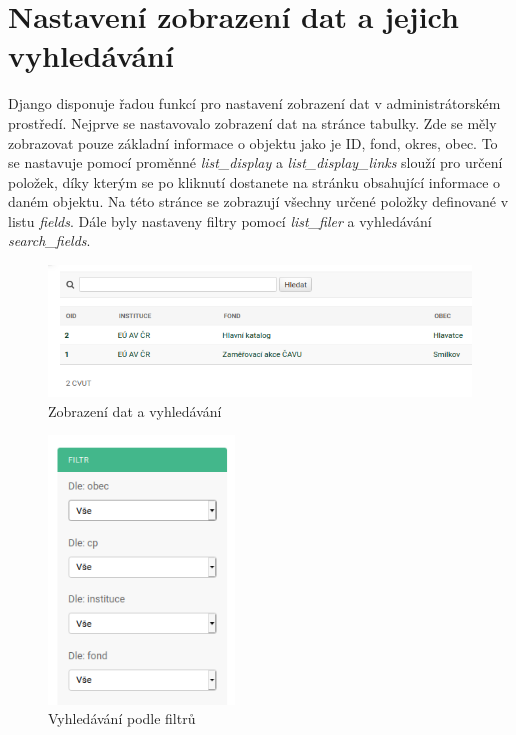 \section{Nastavení zobrazení dat a jejich vyhledávání}

Django disponuje řadou funkcí pro nastavení zobrazení dat v administrátorském prostředí. Nejprve se nastavovalo zobrazení dat na stránce tabulky. Zde se měly zobrazovat pouze základní informace o objektu jako je ID, fond, okres, obec. To se nastavuje pomocí proměnné \emph{list\_display} a \emph{list\_display\_links} slouží pro určení položek, díky kterým se po kliknutí dostanete na stránku obsahující informace o daném objektu. Na této stránce se zobrazují všechny určené položky definované v listu \emph{fields}. Dále byly nastaveny filtry pomocí \emph{list\_filer} a vyhledávání \emph{search\_fields}. 

\begin{figure}[H] \centering
    \includegraphics[width=400pt]{./pictures/21-zobrazeni-dat.PNG}
    \caption[Zobrazení dat a vyhledávání]{Zobrazení dat a vyhledávání}
	\label{fig:Zobrazení dat a vyhledávání}              
\end{figure}

\begin{figure}[H] \centering
    \includegraphics[width=140pt]{./pictures/22-filtry.PNG}
    \caption[Vyhledávání podle filtrů]{Vyhledávání podle filtrů}
	\label{fig:Vyhledávání podle filtrů}              
\end{figure}

